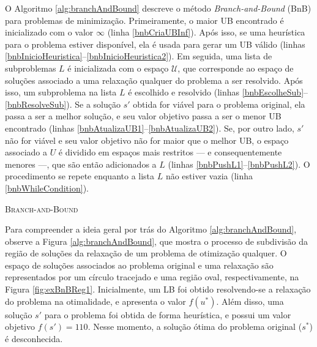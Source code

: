 {O Algoritmo \ref{alg:branchAndBound} descreve o método \textit{Branch-and-Bound} (BnB) para problemas de minimização. Primeiramente, o maior UB encontrado é inicializado com o valor $\infty$ (linha \ref{bnbCriaUBInf}). Após isso, se uma heurística para o problema estiver disponível, ela é usada para gerar um UB válido (linhas \ref{bnbInicioHeuristica}--\ref{bnbInicioHeuristica2}). Em seguida, uma lista de subproblemas $L$ é inicializada com o espaço $\mathcal{U}$, que corresponde ao espaço de soluções associado a uma relaxação qualquer do problema a ser resolvido. Após isso, um subproblema na lista $L$ é escolhido e resolvido (linhas \ref{bnbEscolheSub}--\ref{bnbResolveSub}). Se a solução $s'$ obtida for viável para o problema original, ela passa a ser a melhor solução, e seu valor objetivo passa a ser o menor UB encontrado (linhas \ref{bnbAtualizaUB1}--\ref{bnbAtualizaUB2}). Se, por outro lado, $s'$ não for viável e seu valor objetivo não for maior que o melhor UB, o espaço associado a $U$ é dividido em espaços mais restritos --- e consequentemente menores ---, que são então adicionados a $L$ (linhas \ref{bnbPushL1}--\ref{bnbPushL2}). O procedimento se repete enquanto a lista $L$ não estiver vazia (linha \ref{bnbWhileCondition}).

\begin{algorithm}[ht]
\DontPrintSemicolon
{}
\caption{\textsc{Branch-and-Bound}\label{alg:branchAndBound}}
\end{algorithm}

Para compreender a ideia geral por trás do Algoritmo \ref{alg:branchAndBound}, observe a Figura \ref{alg:branchAndBound}, que mostra o processo de subdivisão da região de soluções da relaxação de um problema de otimização qualquer. O espaço de soluções associados ao problema original e uma relaxação são representados por um círculo tracejado e uma região oval, respectivamente, na Figura \ref{fig:exBnBReg1}. Inicialmente, um LB foi obtido resolvendo-se a relaxação do problema na otimalidade, e apresenta o valor $f(u^*)$. Além disso, uma solução $s'$ para o problema foi obtida de forma heurística, e possui um valor objetivo $f(s') = 110$. Nesse momento, a solução ótima do problema original ($ s^* $) é desconhecida. 

}

